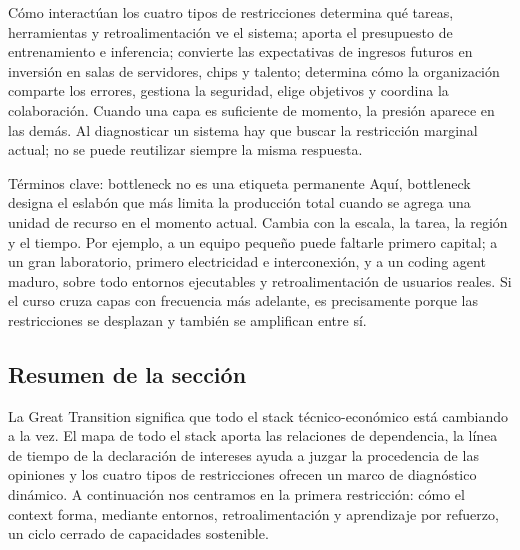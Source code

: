 \begin{importantbox}{Cómo interactúan los cuatro tipos de restricciones}
 determina qué tareas, herramientas y retroalimentación ve el sistema;  aporta el presupuesto de entrenamiento e inferencia;  convierte las expectativas de ingresos futuros en inversión en salas de servidores, chips y talento;  determina cómo la organización comparte los errores, gestiona la seguridad, elige objetivos y coordina la colaboración. Cuando una capa es suficiente de momento, la presión aparece en las demás. Al diagnosticar un sistema hay que buscar la restricción marginal actual; no se puede reutilizar siempre la misma respuesta.
\end{importantbox}

\begin{knowledgebox}{Términos clave: bottleneck no es una etiqueta permanente}
Aquí, bottleneck designa el eslabón que más limita la producción total cuando se agrega una unidad de recurso en el momento actual. Cambia con la escala, la tarea, la región y el tiempo. Por ejemplo, a un equipo pequeño puede faltarle primero capital; a un gran laboratorio, primero electricidad e interconexión, y a un coding agent maduro, sobre todo entornos ejecutables y retroalimentación de usuarios reales. Si el curso cruza capas con frecuencia más adelante, es precisamente porque las restricciones se desplazan y también se amplifican entre sí.
\end{knowledgebox}

\subsection{Resumen de la sección}

La Great Transition significa que todo el stack técnico-económico está cambiando a la vez. El mapa de todo el stack aporta las relaciones de dependencia, la línea de tiempo de la declaración de intereses ayuda a juzgar la procedencia de las opiniones y los cuatro tipos de restricciones ofrecen un marco de diagnóstico dinámico. A continuación nos centramos en la primera restricción: cómo el context forma, mediante entornos, retroalimentación y aprendizaje por refuerzo, un ciclo cerrado de capacidades sostenible.

